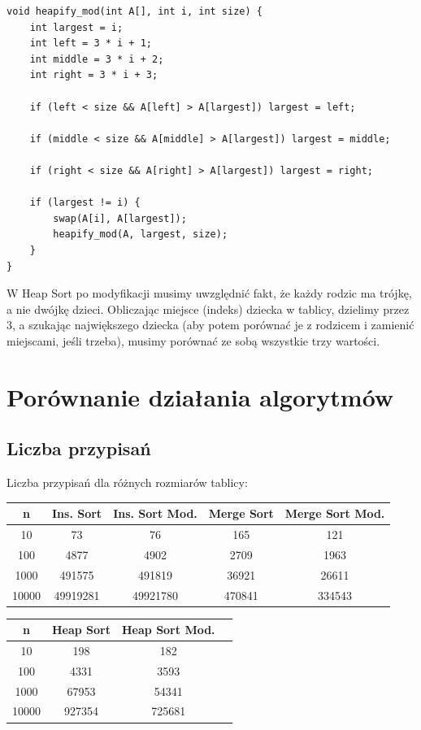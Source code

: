 \documentclass{article}
\begin{document}
\begin{verbatim}
void heapify_mod(int A[], int i, int size) {
    int largest = i;
    int left = 3 * i + 1;
    int middle = 3 * i + 2;
    int right = 3 * i + 3;
    
    if (left < size && A[left] > A[largest]) largest = left;

    if (middle < size && A[middle] > A[largest]) largest = middle;

    if (right < size && A[right] > A[largest]) largest = right;

    if (largest != i) {
        swap(A[i], A[largest]);
        heapify_mod(A, largest, size);
    }
}
\end{verbatim}

W Heap Sort po modyfikacji musimy uwzględnić fakt, że każdy rodzic ma trójkę, a nie dwójkę dzieci. Obliczając miejsce (indeks) dziecka w tablicy, dzielimy przez 3, a szukając największego dziecka (aby potem porównać je z rodzicem i zamienić miejscami, jeśli trzeba), musimy porównać ze sobą wszystkie trzy wartości.

\section{Porównanie działania algorytmów}

\subsection{Liczba przypisań}

Liczba przypisań dla różnych rozmiarów tablicy:

\begin{center}
\begin{tabular}{|c|c|c|c|c|}
 \hline
 n & Ins. Sort & Ins. Sort Mod. & Merge Sort & Merge Sort Mod. \\ 
 \hline
 10 & 73 & 76 & 165 & 121 \\
 100 & 4877 & 4902 & 2709 & 1963 \\
 1000 & 491575 & 491819 & 36921 & 26611 \\
 10000 & 49919281 & 49921780 & 470841 & 334543 \\
 \hline
\end{tabular}

\vspace{0.5cm}

\begin{tabular}{|c|c|c|c|}
 \hline
 n & Heap Sort & Heap Sort Mod. \\ 
 \hline
 10 & 198 & 182 \\
 100 & 4331 & 3593 \\
 1000 & 67953 & 54341 \\
 10000 & 927354 & 725681 \\
 \hline
\end{tabular}
\end{center}
\end{document}
